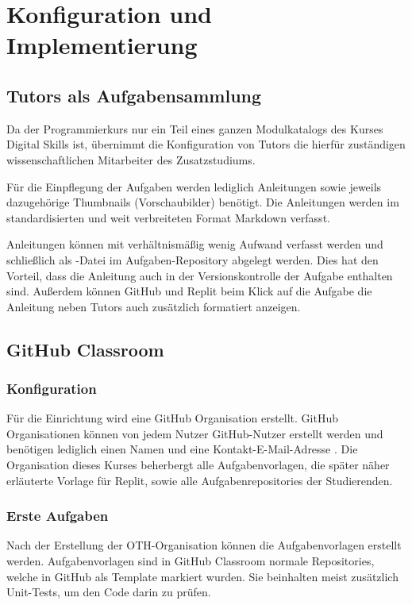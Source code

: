 \section{Konfiguration und Implementierung}\label{konfiguration-u-impl}


\subsection{Tutors als Aufgabensammlung}\label{tutors-als-aufgabensammlung}
Da der Programmierkurs nur ein Teil eines ganzen Modulkatalogs des Kurses
Digital Skills ist, übernimmt die Konfiguration von Tutors die hierfür
zuständigen wissenschaftlichen Mitarbeiter des Zusatzstudiums.

Für die Einpflegung der Aufgaben werden lediglich Anleitungen sowie
jeweils dazugehörige Thumbnails (Vorschaubilder) benötigt. Die Anleitungen
werden im standardisierten und weit verbreiteten Format Markdown verfasst.

Anleitungen können mit verhältnismäßig wenig Aufwand verfasst werden und
schließlich als -Datei im Aufgaben-Repository abgelegt
werden. Dies hat den Vorteil, dass die Anleitung auch in der Versionskontrolle
der Aufgabe enthalten sind. Außerdem können GitHub und Replit beim Klick auf die
Aufgabe die Anleitung neben Tutors auch zusätzlich formatiert anzeigen.

\subsection{GitHub Classroom}\label{github-classroom}
\subsubsection{Konfiguration}\label{classroom-konfiguration}
Für die Einrichtung wird eine GitHub Organisation erstellt. GitHub
Organisationen können von jedem Nutzer GitHub-Nutzer erstellt werden und
benötigen lediglich einen Namen und eine Kontakt-E-Mail-Adresse
\parencite{github-organisation-erstellen}. Die Organisation dieses Kurses
beherbergt alle Aufgabenvorlagen, die später näher erläuterte Vorlage für
Replit, sowie alle Aufgabenrepositories der Studierenden.

\subsubsection{Erste Aufgaben}\label{classroom-erste-aufgaben}
Nach der Erstellung der OTH-Organisation können die Aufgabenvorlagen erstellt
werden. Aufgabenvorlagen sind in GitHub Classroom normale Repositories, welche
in GitHub als Template markiert wurden. Sie beinhalten meist zusätzlich
Unit-Tests, um den Code darin zu prüfen.

